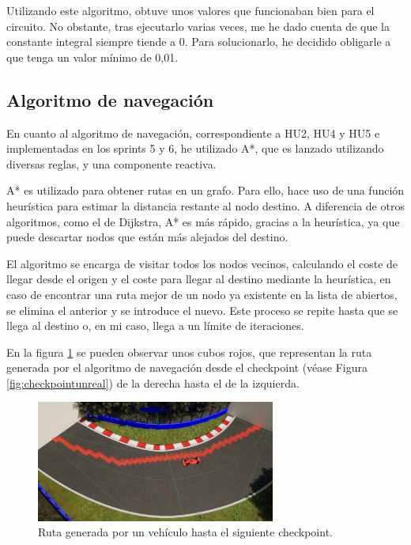 \bigskip

Utilizando este algoritmo, obtuve unos valores que funcionaban bien para el circuito. No obstante, tras ejecutarlo varias veces, me he dado cuenta de que la constante integral siempre tiende a 0. Para solucionarlo, he decidido obligarle a que tenga un valor mínimo de 0,01.


\subsection{Algoritmo de navegación}

En cuanto al algoritmo de navegación, correspondiente a HU2, HU4 y HU5 e implementadas en los sprints 5 y 6, he utilizado A*\cite{4082128}, que es lanzado utilizando diversas reglas, y una componente reactiva. 

\bigskip

A* es utilizado para obtener rutas en un grafo. Para ello, hace uso de una función heurística para estimar la distancia restante al nodo destino. A diferencia de otros algoritmos, como el de Dijkstra, A* es más rápido, gracias a la heurística, ya que puede descartar nodos que están más alejados del destino.

\bigskip

El algoritmo se encarga de visitar todos los nodos vecinos, calculando el coste de llegar desde el origen y el coste para llegar al destino mediante la heurística, en caso de encontrar una ruta mejor de un nodo ya existente en la lista de abiertos, se elimina el anterior y se introduce el nuevo. Este proceso se repite hasta que se llega al destino o, en mi caso, llega a un límite de iteraciones.

\bigskip

En la figura \ref{fig:rutaastar} se pueden observar unos cubos rojos, que representan la ruta generada por el algoritmo de navegación desde el checkpoint (véase Figura \ref{fig:checkpointunreal}) de la derecha hasta el de la izquierda.

\begin{figure}[H]
    \centering
    \includegraphics[width=0.7\textwidth]{imagenes/converted/rutaAStar.jpg}
    \caption{Ruta generada por un vehículo hasta el siguiente checkpoint.}
    \label{fig:rutaastar}
\end{figure}


